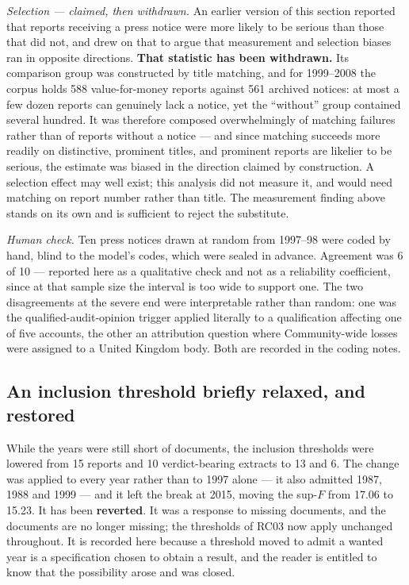 \emph{Selection --- claimed, then withdrawn.} An earlier version of this section reported that
reports receiving a press notice were more likely to be serious than those that did not, and drew
on that to argue that measurement and selection biases ran in opposite directions. \textbf{That
statistic has been withdrawn.} Its comparison group was constructed by title matching, and for
1999--2008 the corpus holds 588 value-for-money reports against 561 archived notices: at most a
few dozen reports can genuinely lack a notice, yet the ``without'' group contained several
hundred. It was therefore composed overwhelmingly of matching failures rather than of reports
without a notice --- and since matching succeeds more readily on distinctive, prominent titles,
and prominent reports are likelier to be serious, the estimate was biased in the direction claimed
by construction. A selection effect may well exist; this analysis did not measure it, and would
need matching on report number rather than title. The measurement finding above stands on its own
and is sufficient to reject the substitute.

\emph{Human check.} Ten press notices drawn at random from 1997--98 were coded by hand, blind to
the model's codes, which were sealed in advance. Agreement was 6 of 10 --- reported here as a
qualitative check and not as a reliability coefficient, since at that sample size the interval is
too wide to support one. The two disagreements at the severe end were interpretable rather than
random: one was the qualified-audit-opinion trigger applied literally to a qualification affecting
one of five accounts, the other an attribution question where Community-wide losses were assigned
to a United Kingdom body. Both are recorded in the coding notes.

\subsection*{An inclusion threshold briefly relaxed, and restored}

While the years were still short of documents, the inclusion thresholds were lowered from 15
reports and 10 verdict-bearing extracts to 13 and 6. The change was applied to every year rather
than to 1997 alone --- it also admitted 1987, 1988 and 1999 --- and it left the break at 2015,
moving the sup-$F$ from 17.06 to 15.23. It has been \textbf{reverted}. It was a response to
missing documents, and the documents are no longer missing; the thresholds of RC03 now apply
unchanged throughout. It is recorded here because a threshold moved to admit a wanted year is a
specification chosen to obtain a result, and the reader is entitled to know that the possibility
arose and was closed.

